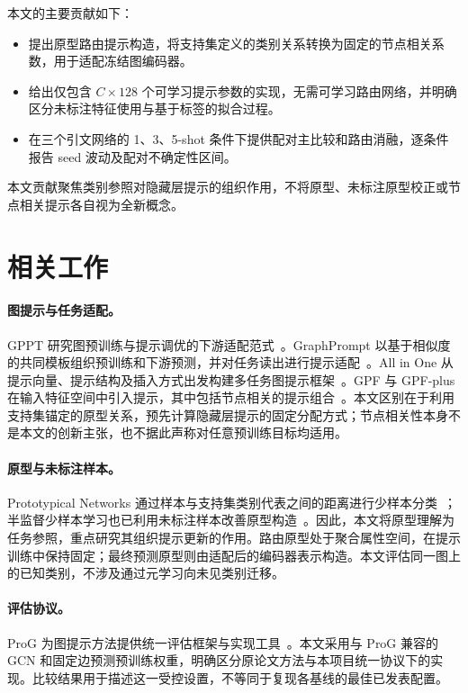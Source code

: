 本文的主要贡献如下：
\begin{itemize}
\item 提出原型路由提示构造，将支持集定义的类别关系转换为固定的节点相关系数，用于适配冻结图编码器。
\item 给出仅包含 $C\times128$ 个可学习提示参数的实现，无需可学习路由网络，并明确区分未标注特征使用与基于标签的拟合过程。
\item 在三个引文网络的 1、3、5-shot 条件下提供配对主比较和路由消融，逐条件报告 seed 波动及配对不确定性区间。
\end{itemize}
本文贡献聚焦类别参照对隐藏层提示的组织作用，不将原型、未标注原型校正或节点相关提示各自视为全新概念。

\section{相关工作}
\paragraph{图提示与任务适配。}
GPPT 研究图预训练与提示调优的下游适配范式~\citep{gppt2022}。GraphPrompt 以基于相似度的共同模板组织预训练和下游预测，并对任务读出进行提示适配~\citep{graphprompt2023}。All in One 从提示向量、提示结构及插入方式出发构建多任务图提示框架~\citep{allinone2023}。GPF 与 GPF-plus 在输入特征空间中引入提示，其中包括节点相关的提示组合~\citep{gpf2023}。本文区别在于利用支持集锚定的原型关系，预先计算隐藏层提示的固定分配方式；节点相关性本身不是本文的创新主张，也不据此声称对任意预训练目标均适用。

\paragraph{原型与未标注样本。}
Prototypical Networks 通过样本与支持集类别代表之间的距离进行少样本分类~\citep{proto2017}；半监督少样本学习也已利用未标注样本改善原型构造~\citep{semiproto2018}。因此，本文将原型理解为任务参照，重点研究其组织提示更新的作用。路由原型处于聚合属性空间，在提示训练中保持固定；最终预测原型则由适配后的编码器表示构造。本文评估同一图上的已知类别，不涉及通过元学习向未见类别迁移。

\paragraph{评估协议。}
ProG 为图提示方法提供统一评估框架与实现工具~\citep{prog2024}。本文采用与 ProG 兼容的 GCN 和固定边预测预训练权重，明确区分原论文方法与本项目统一协议下的实现。比较结果用于描述这一受控设置，不等同于复现各基线的最佳已发表配置。


